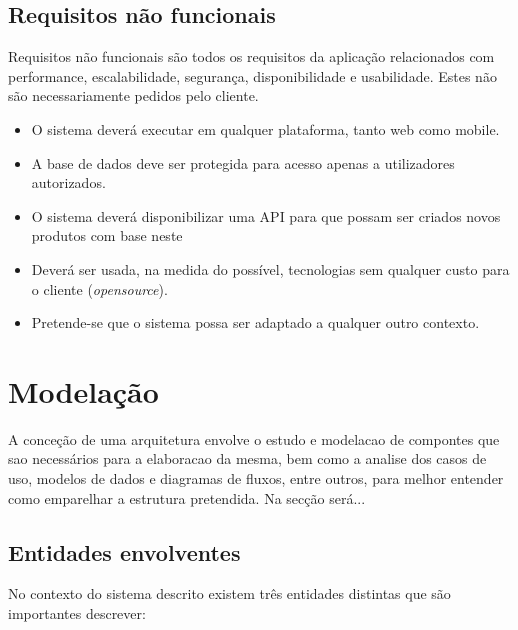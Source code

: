\subsection{Requisitos não funcionais}


Requisitos não funcionais são todos os requisitos da aplicação relacionados com
performance, escalabilidade, segurança, disponibilidade e usabilidade. Estes não são
necessariamente pedidos pelo cliente. 


\begin{itemize}
	\item O sistema deverá executar em qualquer plataforma, tanto web como mobile. 
	
	
	\item A base de dados deve ser protegida para acesso apenas a utilizadores autorizados. 
		
	
	\item O sistema deverá disponibilizar uma API para que possam ser criados novos produtos com base neste 
	
	\item Deverá ser usada, na medida do possível, tecnologias sem qualquer custo para o cliente (\textit{opensource}). 
	
	\item Pretende-se que o sistema possa ser adaptado a qualquer outro contexto. 
	

	
	
\end{itemize}



\section{Modelação}

A conceção de uma arquitetura envolve o estudo e modelacao de compontes que sao necessários para a elaboracao da mesma, bem como a analise dos casos de uso, modelos de dados e diagramas de fluxos, entre outros, para melhor entender como emparelhar a estrutura pretendida. Na secção será... %



\subsection{Entidades envolventes}




No contexto do sistema descrito existem três entidades distintas que são importantes descrever: 

